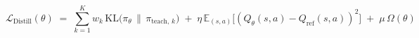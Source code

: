 \begin{equation}
\mathcal{L}_{\mathrm{Distill}}(\theta) \; = \; \sum_{k=1}^{K} w_k \, \mathrm{KL}\!\bigl(\pi_\theta \,\|\, \pi_{\mathrm{teach},\,k}\bigr) \; + \; \eta \, \mathbb{E}_{(s, a)} \bigl[ (Q_\theta(s, a) - Q_{\mathrm{ref}}(s, a))^2 \bigr] \; + \; \mu \, \Omega(\theta)
\end{equation}
